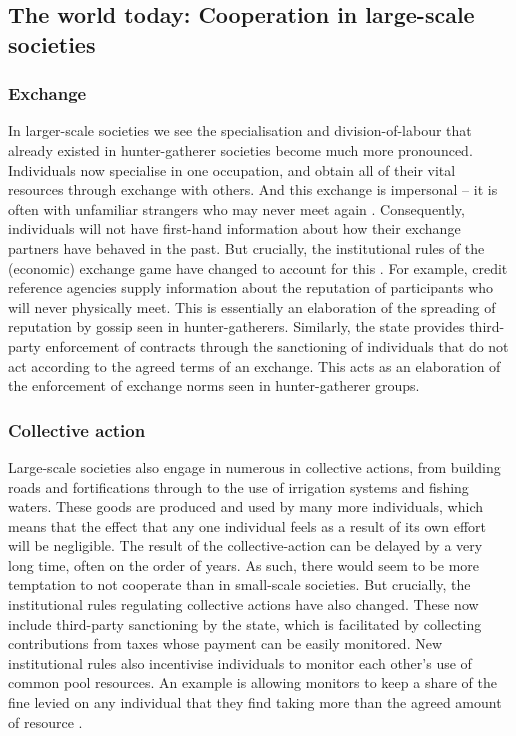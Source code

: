 \documentclass[10pt, a4paper, fleqn]{article}
\begin{document}
\subsection*{The world today: Cooperation in large-scale societies}

\subsubsection*{Exchange}

In larger-scale societies we see the specialisation and division-of-labour that already existed in hunter-gatherer societies become much more pronounced. Individuals now specialise in one occupation, and obtain all of their vital resources through exchange with others. And this exchange is impersonal -- it is often with unfamiliar strangers who may never meet again \citep{North:1990:a,Greif:2006:a,Seabright:2010:a}. Consequently, individuals will not have first-hand information about how their exchange partners have behaved in the past. But crucially, the institutional rules of the (economic) exchange game have changed to account for this \citep{Milgrom:1990:a,Greif:1994:a,Greif:2006:a}. For example, credit reference agencies supply information about the reputation of participants who will never physically meet. This is essentially an elaboration of the spreading of reputation by gossip seen in hunter-gatherers. Similarly, the state provides third-party enforcement of contracts through the sanctioning of individuals that do not act according to the agreed terms of an exchange. This acts as an elaboration of the enforcement of exchange norms seen in hunter-gatherer groups. 


\subsubsection*{Collective action}

Large-scale societies also engage in numerous in collective actions, from building roads and fortifications through to the use of irrigation systems and fishing waters. These goods are produced and used by many more individuals, which means that the effect that any one individual feels as a result of its own effort will be negligible.  The result of the collective-action can be delayed by a very long time, often on the order of years. As such, there would seem to be more temptation to not cooperate than in small-scale societies. But crucially, the institutional rules regulating collective actions have also changed. These now include third-party sanctioning by the state, which is facilitated by collecting contributions from taxes whose payment can be easily monitored. New institutional rules also incentivise individuals to monitor each other's use of common pool resources. An example is allowing monitors to keep a share of the fine levied on any individual that they find taking more than the agreed amount of resource \citep{Ostrom:1990:a,Guala:2012:a}.
\end{document}
